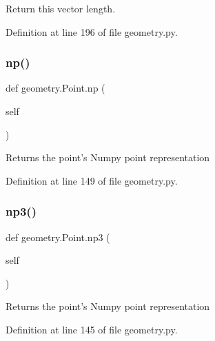 \begin{DoxyVerb}Return this vector length.\end{DoxyVerb}
 

Definition at line 196 of file geometry.\+py.

\mbox{\label{classgeometry_1_1Point_a133d82361f16f975fcb232ba41ff5562}} 
\subsubsection{\texorpdfstring{np()}{np()}}
{\footnotesize\ttfamily def geometry.\+Point.\+np (\begin{DoxyParamCaption}\item[{}]{self }\end{DoxyParamCaption})}

\begin{DoxyVerb}Returns the point's Numpy point representation\end{DoxyVerb}
 

Definition at line 149 of file geometry.\+py.

\mbox{\label{classgeometry_1_1Point_a12ce9dea666d1b40218822a89bada540}} 
\subsubsection{\texorpdfstring{np3()}{np3()}}
{\footnotesize\ttfamily def geometry.\+Point.\+np3 (\begin{DoxyParamCaption}\item[{}]{self }\end{DoxyParamCaption})}

\begin{DoxyVerb}Returns the point's Numpy point representation\end{DoxyVerb}
 

Definition at line 145 of file geometry.\+py.

\mbox{\label{classgeometry_1_1Point_a28f393df5b0c4a297157a3ae55f1f4a3}} 
